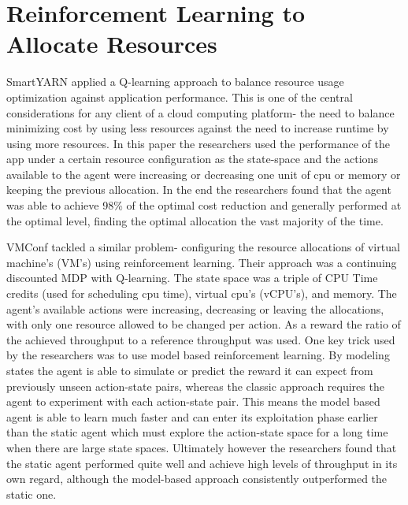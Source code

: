 \section{Reinforcement Learning to Allocate Resources}
 \label{rl_allocation}
 
SmartYARN applied a Q-learning approach to balance resource  usage optimization against application performance. This is one of the central considerations for any client of a cloud computing platform- the need to balance minimizing cost by using less resources against the need to increase runtime by using more resources. In this paper the researchers used the performance of the app under a certain resource configuration as the state-space and the actions available to the agent were increasing or decreasing one unit of cpu or memory or keeping the previous allocation. In the end the researchers found that the agent was able to achieve 98\% of the optimal cost reduction and generally performed at the optimal level, finding the optimal allocation the vast majority of the time.

VMConf tackled a similar problem- configuring the resource allocations of virtual machine's (VM's) using reinforcement learning. Their approach was a continuing discounted MDP with Q-learning. The state space was a triple of CPU Time credits (used for scheduling cpu time), virtual cpu's (vCPU's), and memory. The agent's available actions were increasing, decreasing or leaving the allocations, with only one resource allowed to be changed per action. As a reward the ratio of the achieved throughput to a reference throughput was used. One key trick used by the researchers was to use model based reinforcement learning. By modeling states the agent is able to simulate or predict the reward it can expect from previously unseen action-state pairs, whereas the classic approach requires the agent to experiment with each action-state pair. This means the model based agent is able to learn much faster and can enter its exploitation phase earlier than the static agent which must explore the action-state space for a long time when there are large state spaces. Ultimately however the researchers found that the static agent performed quite well and achieve high levels of throughput in its own regard, although the model-based approach consistently outperformed the static one. 

